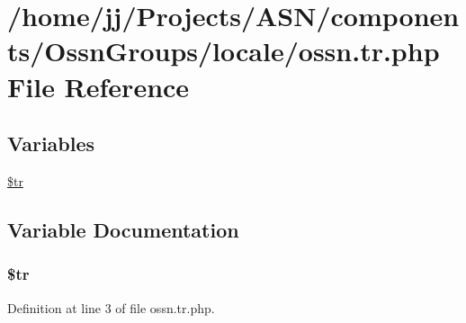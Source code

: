 \hypertarget{components_2_ossn_groups_2locale_2ossn_8tr_8php}{}\section{/home/jj/\+Projects/\+A\+S\+N/components/\+Ossn\+Groups/locale/ossn.tr.\+php File Reference}
\label{components_2_ossn_groups_2locale_2ossn_8tr_8php}
\subsection*{Variables}
\begin{DoxyCompactItemize}
\item 
\hyperlink{components_2_ossn_groups_2locale_2ossn_8tr_8php_a925f466a276b200c71b2567d39b4dba7}{\$tr}
\end{DoxyCompactItemize}


\subsection{Variable Documentation}
\subsubsection[{\texorpdfstring{\$tr}{$tr}}]{\setlength{\rightskip}{0pt plus 5cm}\$tr}\hypertarget{components_2_ossn_groups_2locale_2ossn_8tr_8php_a925f466a276b200c71b2567d39b4dba7}{}\label{components_2_ossn_groups_2locale_2ossn_8tr_8php_a925f466a276b200c71b2567d39b4dba7}


Definition at line 3 of file ossn.\+tr.\+php.

